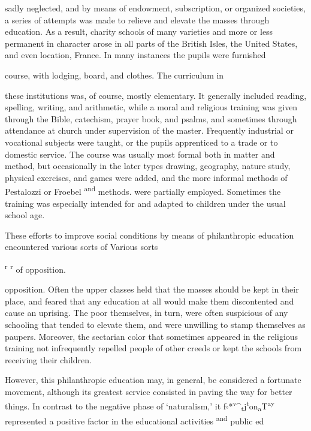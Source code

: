 \documentclass[
]{book}
\begin{document}
sadly neglected, and by means of endowment, subscription, or organized societies, a series of attempts was made to relieve and elevate the masses through education. As a result, charity schools of many varieties and more or less permanent in character arose in all parts of the British Isles, the United States, and even location, France. In many instances the pupils were furnished

course, with lodging, board, and clothes. The curriculum in

these institutions was, of course, mostly elementary. It generally included reading, spelling, writing, and arithmetic, while a moral and religious training was given\protect\hypertarget{ch20.xmlux5cux23para.310.1.0.box.141.245.1242.637.q.60}{}{ through the Bible, catechism, prayer book, and psalms, and sometimes through attendance at church under supervision of the master. Frequently industrial or vocational subjects were taught, or the pupils apprenticed to a trade or to domestic service. The course was usually most formal both in matter and method, but occasionally in the later types drawing, geography, nature study, physical exercises, and games were added, and the more informal methods of Pestalozzi or Froebel \textsuperscript{and} methods. were partially employed. Sometimes the training was especially intended for and adapted to children under the usual school age.}

These efforts to improve social conditions by means of philanthropic education encountered various sorts of Various sorts

\textsuperscript{r} \textsuperscript{r} of opposition.

opposition. Often the upper classes held that the masses should be kept in their place, and feared that any education at all would make them discontented and cause an uprising. The poor themselves, in turn, were often suspicious of any schooling that tended to elevate them, and were unwilling to stamp themselves as paupers. Moreover, the sectarian color that sometimes appeared in the religious training not infrequently repelled people of other creeds or kept the schools from receiving their children.

However, this philanthropic education may, in general, be considered a fortunate movement, although its greatest service consisted in paving the way for better things. In contrast to the negative phase of `naturalism,' it f\textsubscript{°}*\textsuperscript{v}\^{}\textsubscript{t}j\textsuperscript{t}on\textsubscript{a}T\textsuperscript{ay} represented a positive factor in the educational activities \textsuperscript{and} public ed
\end{document}
